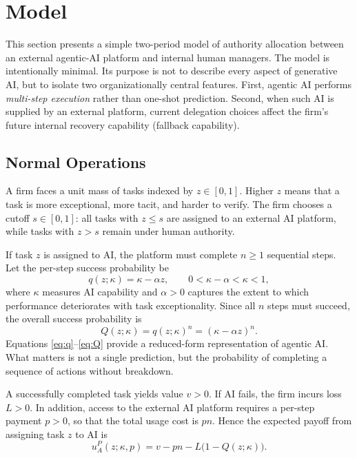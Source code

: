 \section{Model}
\label{sec:model}

This section presents a simple two-period model of authority allocation between an external agentic-AI platform and internal human managers. The model is intentionally minimal. Its purpose is not to describe every aspect of generative AI, but to isolate two organizationally central features. First, agentic AI performs \emph{multi-step execution} rather than one-shot prediction. Second, when such AI is supplied by an external platform, current delegation choices affect the firm's future internal recovery capability (fallback capability).

\subsection{Normal Operations}
\label{subsec:normal}

A firm faces a unit mass of tasks indexed by $z\in[0,1]$. Higher $z$ means that a task is more exceptional, more tacit, and harder to verify. The firm chooses a cutoff $s\in[0,1]$: all tasks with $z\le s$ are assigned to an external AI platform, while tasks with $z>s$ remain under human authority.

If task $z$ is assigned to AI, the platform must complete $n\ge 1$ sequential steps. Let the per-step success probability be
\begin{equation}
\label{eq:q}
q(z;\kappa)=\kappa-\alpha z,
\qquad 0<\kappa-\alpha<\kappa<1,
\end{equation}
where $\kappa$ measures AI capability and $\alpha>0$ captures the extent to which performance deteriorates with task exceptionality. Since all $n$ steps must succeed, the overall success probability is
\begin{equation}
\label{eq:Q}
Q(z;\kappa)=q(z;\kappa)^n=(\kappa-\alpha z)^n.
\end{equation}
Equations \eqref{eq:q}--\eqref{eq:Q} provide a reduced-form representation of agentic AI. What matters is not a single prediction, but the probability of completing a sequence of actions without breakdown.

A successfully completed task yields value $v>0$. If AI fails, the firm incurs loss $L>0$. In addition, access to the external AI platform requires a per-step payment $p>0$, so that the total usage cost is $pn$. Hence the expected payoff from assigning task $z$ to AI is
\begin{equation}
\label{eq:uA}
u_A^P(z;\kappa,p)=v-pn-L\bigl(1-Q(z;\kappa)\bigr).
\end{equation}

